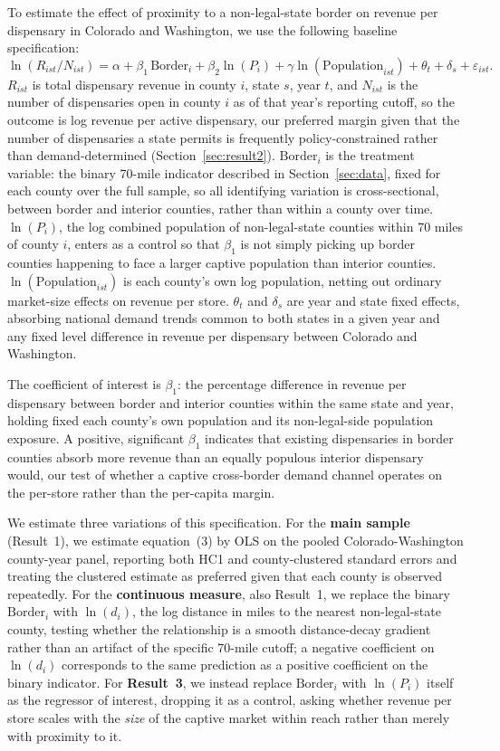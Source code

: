\documentclass[12pt]{article}
\begin{document}
To estimate the effect of proximity to a non-legal-state border on revenue per dispensary in Colorado and
Washington, we use the following baseline specification:
\begin{equation}
\ln(R_{ist}/N_{ist}) = \alpha + \beta_1\,\text{Border}_i + \beta_2\ln(P_i) + \gamma\ln(\text{Population}_{ist}) + \theta_t + \delta_s + \varepsilon_{ist}.
\end{equation}
$R_{ist}$ is total dispensary revenue in county $i$, state $s$, year $t$, and $N_{ist}$ is the number of
dispensaries open in county $i$ as of that year's reporting cutoff, so the outcome is log revenue per active
dispensary, our preferred margin given that the number of dispensaries a state permits is frequently
policy-constrained rather than demand-determined (Section~\ref{sec:result2}). $\text{Border}_i$ is the
treatment variable: the binary 70-mile indicator described in Section~\ref{sec:data}, fixed for each county
over the full sample, so all identifying variation is cross-sectional, between border and interior counties,
rather than within a county over time. $\ln(P_i)$, the log combined population of non-legal-state counties
within 70 miles of county $i$, enters as a control so that $\beta_1$ is not simply picking up border counties
happening to face a larger captive population than interior counties. $\ln(\text{Population}_{ist})$ is each
county's own log population, netting out ordinary market-size effects on revenue per store. $\theta_t$ and
$\delta_s$ are year and state fixed effects, absorbing national demand trends common to both states in a
given year and any fixed level difference in revenue per dispensary between Colorado and Washington.

The coefficient of interest is $\beta_1$: the percentage difference in revenue per dispensary between border
and interior counties within the same state and year, holding fixed each county's own population and its
non-legal-side population exposure. A positive, significant $\beta_1$ indicates that existing dispensaries in
border counties absorb more revenue than an equally populous interior dispensary would, our test of whether a
captive cross-border demand channel operates on the per-store rather than the per-capita margin.

We estimate three variations of this specification. For the \textbf{main sample} (Result~1), we estimate
equation~(3) by OLS on the pooled Colorado-Washington county-year panel, reporting both HC1 and
county-clustered standard errors and treating the clustered estimate as preferred given that each county is
observed repeatedly. For the \textbf{continuous measure}, also Result~1, we replace the binary
$\text{Border}_i$ with $\ln(d_i)$, the log distance in miles to the nearest non-legal-state county, testing
whether the relationship is a smooth distance-decay gradient rather than an artifact of the specific 70-mile
cutoff; a negative coefficient on $\ln(d_i)$ corresponds to the same prediction as a positive coefficient on
the binary indicator. For \textbf{Result~3}, we instead replace $\text{Border}_i$ with $\ln(P_i)$ itself as
the regressor of interest, dropping it as a control, asking whether revenue per store scales with the
\emph{size} of the captive market within reach rather than merely with proximity to it.
\end{document}
